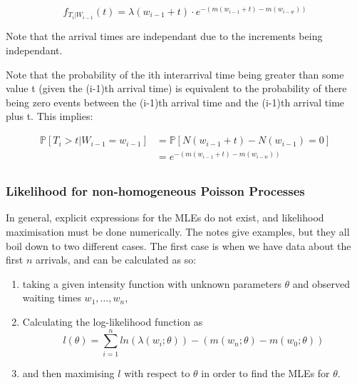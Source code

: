 \documentclass[12pt]{article}
\begin{document}
    \begin{equation*}
        f_{T_i | W_{i-1}}(t) = 
        \lambda(w_{i-1} + t) \cdot e^{-\left(m(w_{i-1} + t) - m(w_{i-w})\right)}
    \end{equation*}

    Note that the arrival times are independant due to the increments being independant. \newline \newline

    Note that the probability of the ith interarrival time being greater than some value t (given 
    the (i-1)th arrival time) is equivalent to the probability of there being zero events between 
    the (i-1)th arrival time and the (i-1)th arrival time plus t. This implies:

    \begin{equation*}
        \begin{aligned}
            \mathbb{P}[T_i > t | W_{i-1} = w_{i-1}] &= \mathbb{P}[N(w_{i-1} + t) - N(w_{i-1}) = 0] \\
            &=  e^{-\left(m(w_{i-1} + t) - m(w_{i-w})\right)} \\
        \end{aligned}
    \end{equation*}
    \subsubsection{Likelihood for non-homogeneous Poisson Processes}
    In general, explicit expressions for the MLEs do not exist, and likelihood maximisation must be 
    done numerically.
    The notes give examples, but they all boil down to two different cases. The first case is when we have data about the first \(n\) arrivals, and can be calculated as so:
    \begin{enumerate}
        \item taking a given intensity function with unknown parameters \(\theta\) and observed waiting times \(w_1, \dots, w_n\),
        \item Calculating the log-likelihood function as 
            \begin{equation*}
                l(\theta) = \sum_{i=1}^{n}ln\left(\lambda(w_i; \theta)\right) - 
                \left(m(w_n; \theta) - m(w_0; \theta)\right)
            \end{equation*}
        \item and then maximising \(l\) with respect to \(\theta\) in order to find the MLEs for \(\theta\).
    \end{enumerate}
\end{document}
